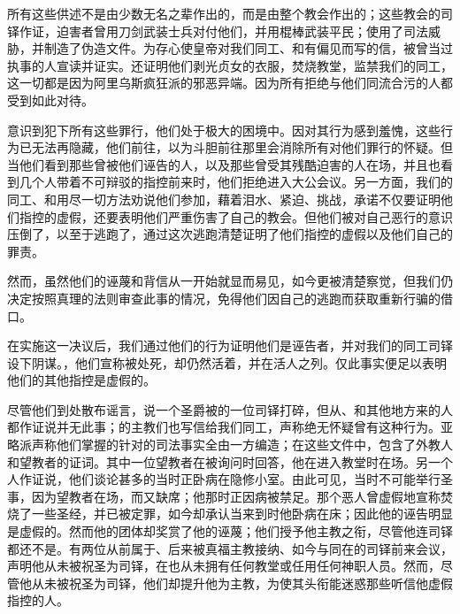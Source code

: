 所有这些供述不是由少数无名之辈作出的，而是由整个教会作出的；这些教会的司铎作证，迫害者曾用刀剑武装士兵对付他们，并用棍棒武装平民；使用了司法威胁，并制造了伪造文件。为存心使皇帝对我们同工、和有偏见而写的信，被曾当过执事的人宣读并证实。还证明他们剥光贞女的衣服，焚烧教堂，监禁我们的同工，这一切都是因为阿里乌斯疯狂派的邪恶异端。因为所有拒绝与他们同流合污的人都受到如此对待。\par

意识到犯下所有这些罪行，他们处于极大的困境中。因对其行为感到羞愧，这些行为已无法再隐藏，他们前往，以为斗胆前往那里会消除所有对他们罪行的怀疑。但当他们看到那些曾被他们诬告的人，以及那些曾受其残酷迫害的人在场，并且也看到几个人带着不可辩驳的指控前来时，他们拒绝进入大公会议。另一方面，我们的同工、和用尽一切方法劝说他们参加，藉着泪水、紧迫、挑战，承诺不仅要证明他们指控的虚假，还要表明他们严重伤害了自己的教会。但他们被对自己恶行的意识压倒了，以至于逃跑了，通过这次逃跑清楚证明了他们指控的虚假以及他们自己的罪责。\par

然而，虽然他们的诬蔑和背信从一开始就显而易见，如今更被清楚察觉，但我们仍决定按照真理的法则审查此事的情况，免得他们因自己的逃跑而获取重新行骗的借口。\par

在实施这一决议后，我们通过他们的行为证明他们是诬告者，并对我们的同工司铎设下阴谋。，他们宣称被处死，却仍然活着，并在活人之列。仅此事实便足以表明他们的其他指控是虚假的。\par

尽管他们到处散布谣言，说一个圣爵被的一位司铎打碎，但从、和其他地方来的人都作证说并无此事；的主教们也写信给我们同工，声称绝无怀疑曾有这种行为。亚略派声称他们掌握的针对的司法事实全由一方编造；在这些文件中，包含了外教人和望教者的证词。其中一位望教者在被询问时回答，他在进入教堂时在场。另一个人作证说，他们谈论甚多的当时正卧病在隐修小室。由此可见，当时不可能举行圣事，因为望教者在场，而又缺席；他那时正因病被禁足。那个恶人曾虚假地宣称焚烧了一些圣经，并已被定罪，如今却承认当来到时他卧病在床；因此他的诬告明显是虚假的。然而他的团体却奖赏了他的诬蔑；他们授予他主教之衔，尽管他连司铎都还不是。有两位从前属于、后来被真福主教接纳、如今与同在的司铎前来会议，声明他从未被祝圣为司铎，在也从未拥有任何教堂或任用任何神职人员。然而，尽管他从未被祝圣为司铎，他们却提升他为主教，为使其头衔能迷惑那些听信他虚假指控的人。\par

